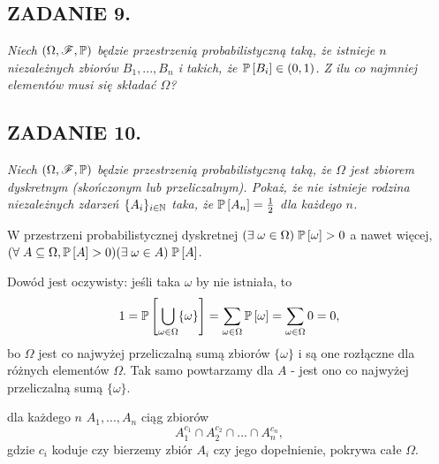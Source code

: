 \documentclass{article}
\begin{document}
\subsection*{ZADANIE 9.}
\emph{\color{pink}Niech $(\Omega,\mathcal{F}, \mathbb{P})$ będzie przestrzenią probabilistyczną taką, że istnieje $n$ niezależnych zbiorów $B_1,...,B_n$ i takich, że $\mathbb{P}\left[B_i\right]\in(0,1)$. Z ilu co najmniej elementów musi się składać $\Omega$?}



\subsection*{ZADANIE 10.}
\emph{\color{pink}Niech $(\Omega, \mathcal{F},\mathbb{P})$ będzie przestrzenią probabilistyczną taką, że $\Omega$ jest zbiorem dyskretnym (skończonym lub przeliczalnym). Pokaż, że nie istnieje rodzina niezależnych zdarzeń $\{A_i\}_{i\in \mathbb{N}}$ taka, że $\mathbb{P}\left[A_n\right]=\frac12$ dla każdego $n$.}

 W przestrzeni probabilistycznej dyskretnej $(\exists\;\omega\in\Omega)\;\mathbb{P}\left[\omega\right]>0$ a nawet więcej, $(\forall\;A\subseteq\Omega,\mathbb{P}\left[A\right]>0)(\exists\;\omega\in A)\;\mathbb{P}\left[A\right]$.

Dowód jest oczywisty: jeśli taka $\omega$ by nie istniała, to
$$1=\mathbb{P}\left[\bigcup\limits_{\omega\in\Omega}\{\omega\}\right]=\sum\limits_{\omega\in\Omega}\mathbb{P}\left[\omega\right]=\sum\limits_{\omega\in\Omega}0=0,$$
bo $\Omega$ jest co najwyżej przeliczalną sumą zbiorów $\{\omega\}$ i są one rozłączne dla różnych elementów $\Omega$. Tak samo powtarzamy dla $A$ - jest ono co najwyżej przeliczalną sumą $\{\omega\}$.
\medskip

\begin{center}
\end{center}
\medskip

 dla każdego $n$ $A_1,...,A_n$ ciąg zbiorów
$$A_1^{c_1}\cap A_2^{c_2}\cap...\cap A_n^{c_n},$$
gdzie $c_i$ koduje czy bierzemy zbiór $A_i$ czy jego dopełnienie, pokrywa całe $\Omega$.
\end{document}
